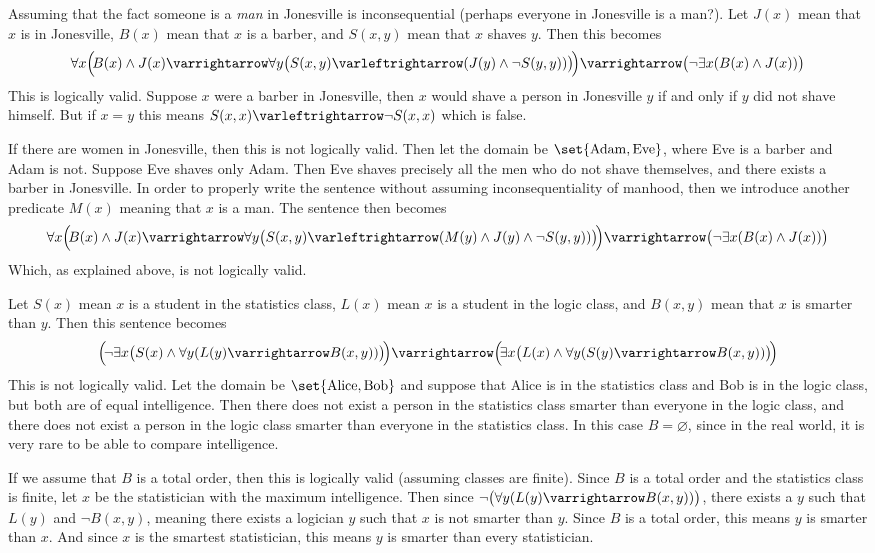 \documentclass[10pt]{article}
\let\to=\varrightarrow
\let\oto=\varleftrightarrow
\begin{document}
        \item Assuming that the fact someone is a \emph{man} in Jonesville is inconsequential (perhaps everyone in Jonesville is a man?).
        Let $J(x)$ mean that $x$ is in Jonesville, $B(x)$ mean that $x$ is a barber, and $S(x,y)$ mean that $x$ shaves $y$.
        Then this becomes
        \[ \forall x\Bigl(\!B(x)\land J(x)\to\forall y\bigl(S(x,y)\oto(J(y)\land\neg S(y,y))\bigr)\!\Bigr)\to\bigl(\neg\exists x(B(x)\land J(x))\bigr) \]
        This is logically valid.
        Suppose $x$ were a barber in Jonesville, then $x$ would shave a person in Jonesville $y$ if and only if $y$ did not shave himself.
        But if $x=y$ this means $S(x,x)\oto\neg S(x,x)$ which is false.

        If there are women in Jonesville, then this is not logically valid.
        Then let the domain be $\set{\mathrm{Adam}, \mathrm{Eve}}$, where Eve is a barber and Adam is not.
        Suppose Eve shaves only Adam.
        Then Eve shaves precisely all the men who do not shave themselves, and there exists a barber in Jonesville.
        In order to properly write the sentence without assuming inconsequentiality of manhood, then we introduce another predicate $M(x)$ meaning that $x$ is a man.
        The sentence then becomes
        \[ \forall x\Bigl(\!B(x)\land J(x)\to\forall y\bigl(S(x,y)\oto(M(y)\land J(y)\land\neg S(y,y))\bigr)\!\Bigr)\to\bigl(\neg\exists x(B(x)\land J(x))\bigr) \]
        Which, as explained above, is not logically valid.

        \item Let $S(x)$ mean $x$ is a student in the statistics class, $L(x)$ mean $x$ is a student in the logic class, and $B(x,y)$ mean that $x$ is smarter than $y$.
        Then this sentence becomes
        \[ \Bigl(\!\neg\exists x\bigl(S(x)\land\forall y(L(y)\to B(x,y))\bigr)\!\Bigr) \to \Bigl(\!\exists x\bigl(L(x)\land\forall y(S(y)\to B(x,y))\bigr)\!\Bigr) \]
        This is not logically valid.
        Let the domain be $\set{\mathrm{Alice}, \mathrm{Bob}}$ and suppose that Alice is in the statistics class and Bob is in the logic class, but both are of equal intelligence.
        Then there does not exist a person in the statistics class smarter than everyone in the logic class, and there does not exist a person in the logic class smarter than everyone in the statistics
        class.
        In this case $B=\varnothing$, since in the real world, it is very rare to be able to compare intelligence.

        If we assume that $B$ is a total order, then this is logically valid (assuming classes are finite).
        Since $B$ is a total order and the statistics class is finite, let $x$ be the statistician with the maximum intelligence.
        Then since $\neg\bigl(\forall y(L(y)\to B(x,y))\bigr)$, there exists a $y$ such that $L(y)$ and $\neg B(x,y)$, meaning there exists a logician $y$ such that $x$ is not smarter than $y$.
        Since $B$ is a total order, this means $y$ is smarter than $x$.
        And since $x$ is the smartest statistician, this means $y$ is smarter than every statistician.
\end{document}
